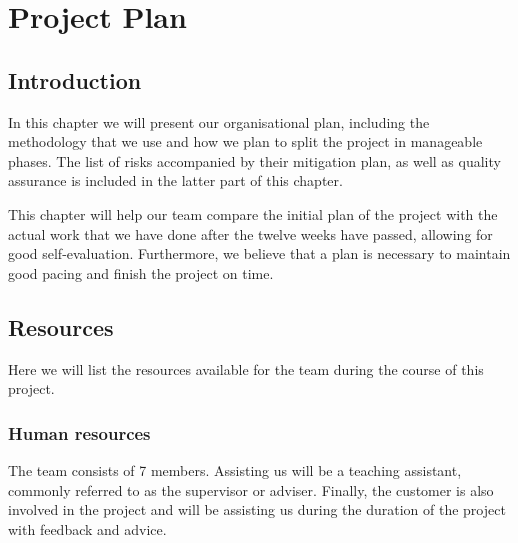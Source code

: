 \documentclass[../document.tex]{subfiles}
\begin{document}
\section{Project Plan}
\subsection{Introduction}
In this chapter we will present our organisational plan, including the methodology that we use and how we plan to split the project in manageable phases. The list of risks accompanied by their mitigation plan, as well as quality assurance is included in the latter part of this chapter.

This chapter will help our team compare the initial plan of the project with the actual work that we have done after the twelve weeks have passed, allowing for good self-evaluation. Furthermore, we believe that a plan is necessary to maintain good pacing and finish the project on time.

\subsection{Resources}
Here we will list the resources available for the team during the course of this project.

\subsubsection{Human resources}
The team consists of 7 members. Assisting us will be a teaching assistant, commonly referred to as the supervisor or adviser. Finally, the customer is also involved in the project and will be assisting us during the duration of the project with feedback and advice.
\end{document}
